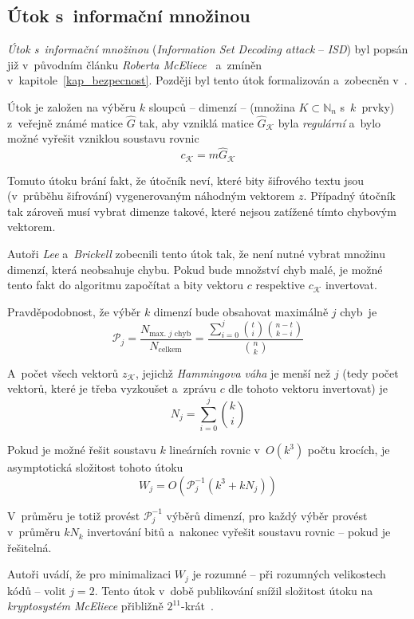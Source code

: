 \documentclass[thesis=M,czech,hidelinks]{FITthesis}[2012/06/26]
\newcommand{\0}{{\textcolor[gray]{0.75}{0}}}
\begin{document}
\subsection{Útok s~informační množinou}

\emph{Útok s~informační množinou} (\emph{Information Set Decoding attack} --
\emph{ISD}) byl popsán již v~původním článku \emph{Roberta
McEliece}~\cite{McEliece} a~zmíněn v~kapitole~\ref{kap_bezpecnost}. Později byl
tento útok formalizován a~zobecněn v~\cite{Lee}.

Útok je založen na výběru $k$ sloupců -- dimenzí -- (množina
$K\subset\mathbb{N}_n$ s~$k$~prvky) z~veřejně známé matice $\hat{G}$ tak, aby
vzniklá matice $\hat{G}_{\mathcal{K}}$ byla \emph{regulární} a~bylo možné
vyřešit vzniklou soustavu rovnic
$$ c_{\mathcal{K}} = m \hat{G}_{\mathcal{K}} $$

Tomuto útoku brání fakt, že útočník neví, které bity šifrového textu jsou
(v~průběhu šifrování)  vygenerovaným náhodným vektorem $z$.
Případný útočník tak zároveň musí vybrat dimenze takové, které nejsou zatížené
tímto chybovým vektorem.

Autoři \emph{Lee} a~\emph{Brickell} zobecnili tento útok tak, že není nutné
vybrat množinu dimenzí, která neobsahuje chybu. Pokud bude množství chyb malé,
je možné tento fakt do algoritmu započítat a bity vektoru $c$ respektive
$c_{\mathcal{K}}$ invertovat.

Pravděpodobnost, že výběr $k$ dimenzí bude obsahovat maximálně $j$ chyb~je
$$
    \mathcal{P}_j= \frac{N_{\text{max. $j$ chyb}}}{N_{\text{celkem}}}
    = \frac{\sum_{i=0}^{j}\binom{t}{i}\binom{n-t}{k-i}}{\binom{n}{k}}
$$

A~počet všech vektorů $z_\mathcal{K}$, jejichž \emph{Hammingova váha} je menší
než $j$ (tedy počet vektorů, které je třeba vyzkoušet a~zprávu $c$ dle tohoto
vektoru invertovat) je
$$ N_j = \sum_{i=0}^{j}\binom{k}{i} $$

Pokud je možné řešit soustavu $k$ lineárních rovnic v~$O(k^3)$ počtu krocích, je
asymptotická složitost tohoto útoku
$$ W_j = O\left( \mathcal{P}_{j}^{-1}\left(k^3 + k N_j \right) \right) $$

V~průměru je totiž provést $\mathcal{P}_{j}^{-1}$ výběrů dimenzí, pro každý
výběr provést v~průměru $k N_k$ invertování bitů a~nakonec vyřešit soustavu
rovnic -- pokud je řešitelná.

Autoři uvádí, že pro minimalizaci $W_j$ je rozumné -- při rozumných velikostech
kódů -- volit $j=2$. Tento útok v~době publikování snížil složitost útoku na
\emph{kryptosystém McEliece} přibližně $2^11$-krát~\cite{Lee}.
\end{document}
